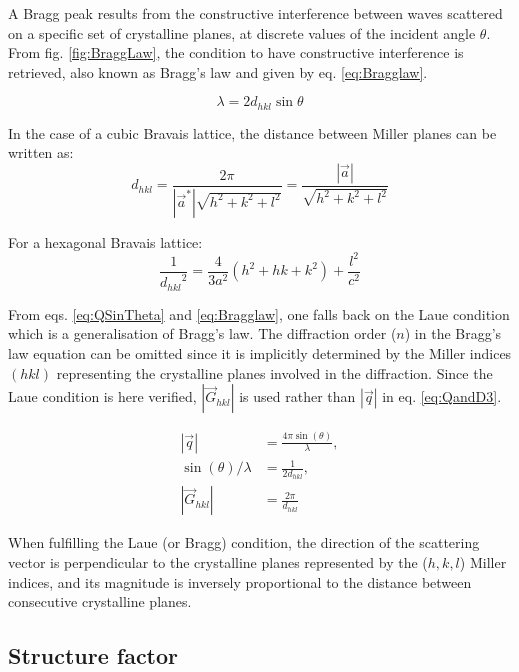 A Bragg peak results from the constructive interference between waves scattered on a specific set of crystalline planes, at discrete values of the incident angle $\theta$.
From fig. \ref{fig:BraggLaw}, the condition to have constructive interference is retrieved, also known as Bragg's law and given by eq. \ref{eq:Bragglaw}.

\begin{equation}
    \label{eq:Bragglaw}
    \lambda = 2d_{hkl} \sin{\theta}%
\end{equation}

In the case of a cubic Bravais lattice, the distance between Miller planes can be written as:
\begin{equation}
    \label{eq:Interplanarspacing}
    d_{hkl}=\frac{2\pi}{|\vec{a}^*|\sqrt{h^2 + k^2 + l^2}}=\frac{|\vec{a}|}{\sqrt{h^2 + k^2 + l^2}}
\end{equation}

For a hexagonal Bravais lattice:
\begin{equation}
    \label{eq:InterplanarspacingHex}
    \frac{1}{{d_{hkl}}^2}=\frac{4}{3a^2}(h^2 + hk + k^2) + \frac{l^2}{c^2}
\end{equation}

From eqs. \ref{eq:QSinTheta} and \ref{eq:Bragglaw}, one falls back on the Laue condition which is a generalisation of Bragg's law.
The diffraction order ($n$) in the Bragg's law equation can be omitted since it is implicitly determined by the Miller indices $(hkl)$ representing the crystalline planes involved in the diffraction.
Since the Laue condition is here verified, $|\vec{G}_{hkl}|$ is used rather than $|\vec{q}|$ in eq. \ref{eq:QandD3}.

\begin{align}
    \label{eq:QandD1}
    |\vec{q}| & = \frac{4\pi \sin(\theta)}{\lambda},\\
    \label{eq:QandD2}
    \sin(\theta) / \lambda & = \frac{1}{2d_{hkl}},\\
    \label{eq:QandD3}
    |\vec{G}_{hkl}| & = \frac{2\pi}{d_{hkl}}
\end{align}{}

When fulfilling the Laue (or Bragg) condition, the direction of the scattering vector is perpendicular to the crystalline planes represented by the ($h, k, l$) Miller indices, and its magnitude is inversely proportional to the distance between consecutive crystalline planes.

\subsection{Structure factor} \label{sec:StructureFactor}

